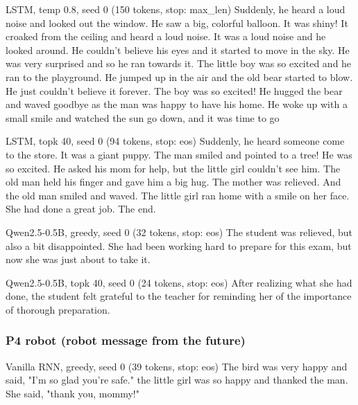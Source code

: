 \begin{modelout}{LSTM, temp 0.8, seed 0 (150 tokens, stop: max\_len)}
\small Suddenly, he heard a loud noise and looked out the window. He saw a big, colorful balloon. It was shiny! It croaked from the ceiling and heard a loud noise. It was a loud noise and he looked around. He couldn't believe his eyes and it started to move in the sky. He was very surprised and so he ran towards it. The little boy was so excited and he ran to the playground. He jumped up in the air and the old bear started to blow. He just couldn't believe it forever. The boy was so excited! He hugged the bear and waved goodbye as the man was happy to have his home. He woke up with a small smile and watched the sun go down, and it was time to go
\end{modelout}

\begin{modelout}{LSTM, topk 40, seed 0 (94 tokens, stop: eos)}
\small Suddenly, he heard someone come to the store. It was a giant puppy. The man smiled and pointed to a tree! He was so excited. He asked his mom for help, but the little girl couldn't see him. The old man held his finger and gave him a big hug. The mother was relieved. And the old man smiled and waved. The little girl ran home with a smile on her face. She had done a great job. The end.
\end{modelout}

\begin{modelout}{Qwen2.5-0.5B, greedy, seed 0 (32 tokens, stop: eos)}
\small The student was relieved, but also a bit disappointed. She had been working hard to prepare for this exam, but now she was just about to take it.
\end{modelout}


\begin{modelout}{Qwen2.5-0.5B, topk 40, seed 0 (24 tokens, stop: eos)}
\small After realizing what she had done, the student felt grateful to the teacher for reminding her of the importance of thorough preparation.
\end{modelout}

\subsubsection*{P4 robot (robot message from the future)}

\begin{modelout}{Vanilla RNN, greedy, seed 0 (39 tokens, stop: eos)}
\small The bird was very happy and said, "I'm so glad you're safe." the little girl was so happy and thanked the man. She said, "thank you, mommy!"
\end{modelout}

